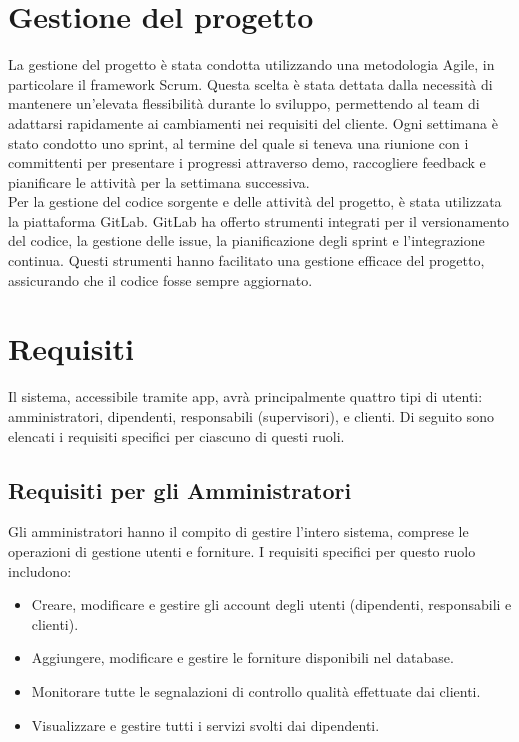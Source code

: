 \documentclass[twoside]{supsistudent}
\begin{document}
\section{Gestione del progetto}

La gestione del progetto è stata condotta utilizzando una metodologia Agile, in particolare il framework Scrum. Questa scelta è stata dettata dalla necessità di mantenere un'elevata flessibilità durante lo sviluppo, permettendo al team di adattarsi rapidamente ai cambiamenti nei requisiti del cliente. Ogni settimana è stato condotto uno sprint, al termine del quale si teneva una riunione con i committenti per presentare i progressi attraverso demo, raccogliere feedback e pianificare le attività per la settimana successiva.
\\
Per la gestione del codice sorgente e delle attività del progetto, è stata utilizzata la piattaforma GitLab. GitLab ha offerto strumenti integrati per il versionamento del codice, la gestione delle issue, la pianificazione degli sprint e l'integrazione continua. Questi strumenti hanno facilitato una gestione efficace del progetto, assicurando che il codice fosse sempre aggiornato.

\section{Requisiti}

Il sistema, accessibile tramite app, avrà principalmente quattro tipi di utenti: amministratori, dipendenti, responsabili (supervisori), e clienti. Di seguito sono elencati i requisiti specifici per ciascuno di questi ruoli.

\subsection{Requisiti per gli Amministratori}

Gli amministratori hanno il compito di gestire l'intero sistema, comprese le operazioni di gestione utenti e forniture. I requisiti specifici per questo ruolo includono:

\begin{itemize}
  \item Creare, modificare e gestire gli account degli utenti (dipendenti, responsabili e clienti).
  \item Aggiungere, modificare e gestire le forniture disponibili nel database.
  \item Monitorare tutte le segnalazioni di controllo qualità effettuate dai clienti.
  \item Visualizzare e gestire tutti i servizi svolti dai dipendenti.
\end{itemize}
\end{document}
